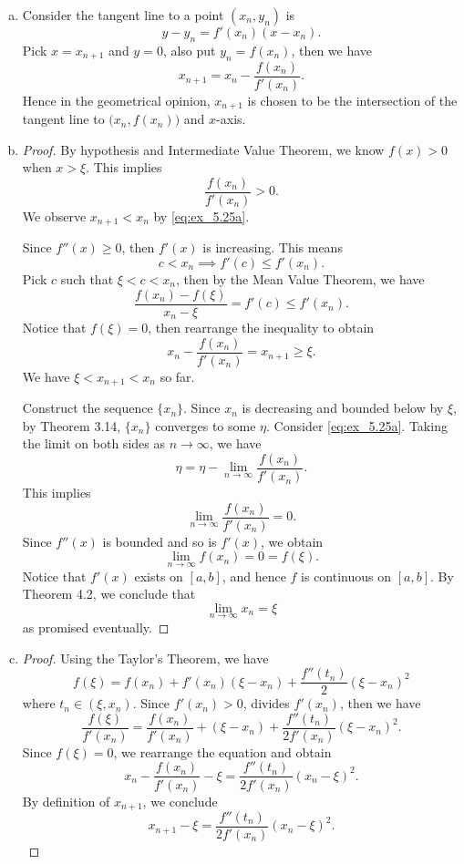 \begin{Exercise}
\begin{enumerate}[(a)]
\item 
\begin{solution}
Consider the tangent line to a point $(x_n, y_n)$ is
$$
y-y_n = f'(x_n) (x-x_n).
$$
Pick $x = x_{n+1}$ and $y = 0$, also put $y_n = f(x_n)$, then we have
\begin{equation}\label{eq:ex_5.25a}
x_{n+1} = x_n - \frac{f(x_n)}{f'(x_n)}.
\end{equation}
Hence in the geometrical opinion, $x_{n+1}$ is chosen to be the intersection of the tangent line to $\big(x_n, f(x_n)\big)$ and $x$-axis.
\end{solution}

\item
\begin{proof}
By hypothesis and Intermediate Value Theorem, we know $f(x) > 0$ when $x > \xi$. This implies
$$
\frac{f(x_n)}{f'(x_n)} > 0.
$$
We observe $x_{n+1} < x_n$ by \eqref{eq:ex_5.25a}.

Since $f''(x) \geq 0$, then $f'(x)$ is increasing. This means
$$
c < x_n \implies f'(c) \leq f'(x_n).
$$
Pick $c$ such that $\xi < c < x_n$, then by the Mean Value Theorem, we have
$$
\frac{f(x_n)-f(\xi)}{x_n-\xi} = f'(c) \leq f'(x_n).
$$
Notice that $f(\xi) = 0$, then rearrange the inequality to obtain
$$
x_n - \frac{f(x_n)}{f'(x_n)} = x_{n+1}\geq \xi.
$$
We have $\xi < x_{n+1} < x_n$ so far.

Construct the sequence $\{x_n\}$.
Since $x_n$ is decreasing and bounded below by $\xi$, by Theorem 3.14, $\{x_n\}$ converges to some $\eta$.
Consider \eqref{eq:ex_5.25a}.
Taking the limit on both sides as $n\to\infty$, we have
$$
\eta = \eta - \lim_{n\to\infty}\frac{f(x_n)}{f'(x_n)}.
$$
This implies
$$
\lim_{n\to\infty}\frac{f(x_n)}{f'(x_n)} = 0.
$$
Since $f''(x)$ is bounded and so is $f'(x)$, we obtain
$$
\lim_{n\to\infty}f(x_n) = 0 = f(\xi).
$$
Notice that $f'(x)$ exists on $[a,b]$, and hence $f$ is continuous on $[a,b]$. 
By Theorem 4.2, we conclude that
$$
\lim_{n\to\infty}x_n = \xi
$$
as promised eventually.
\end{proof}

\item
\begin{proof}
Using the Taylor's Theorem, we have
$$
f(\xi) = f(x_n) + f'(x_n)(\xi-x_n)+\frac{f''(t_n)}{2}(\xi-x_n)^2
$$
where $t_n\in(\xi, x_n)$.
Since $f'(x_n)> 0$, divides $f'(x_n)$, then we have
$$
\frac{f(\xi)}{f'(x_n)} = \frac{f(x_n)}{f'(x_n)} + (\xi-x_n) + \frac{f''(t_n)}{2f'(x_n)}(\xi-x_n)^2.
$$
Since $f(\xi) = 0$, we rearrange the equation and obtain
$$
x_n - \frac{f(x_n)}{f'(x_n)} - \xi = \frac{f''(t_n)}{2f'(x_n)}(x_n-\xi)^2.
$$
By definition of $x_{n+1}$, we conclude
\begin{equation}\label{eq:ex_5.25d}
x_{n+1} - \xi = \frac{f''(t_n)}{2f'(x_n)}(x_n-\xi)^2.
\end{equation}
\end{proof}


\end{enumerate}
\end{Exercise}
